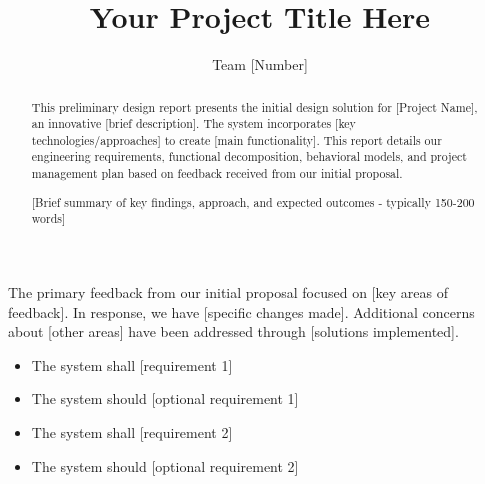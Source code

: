 \documentclass[final]{../designreport}
\title{Your Project Title Here}
\author{Team [Number]}
\begin{document}
\maketitle

\makefrontmatter

\begin{abstract}
This preliminary design report presents the initial design solution for [Project Name], an innovative [brief description]. The system incorporates [key technologies/approaches] to create [main functionality]. This report details our engineering requirements, functional decomposition, behavioral models, and project management plan based on feedback received from our initial proposal.

[Brief summary of key findings, approach, and expected outcomes - typically 150-200 words]
\end{abstract}

\commentresponse
The primary feedback from our initial proposal focused on [key areas of feedback]. In response, we have [specific changes made]. Additional concerns about [other areas] have been addressed through [solutions implemented].




\requirementsspec

\marketingreqs
\begin{itemize}
    \item The system shall [requirement 1]
    \item The system should [optional requirement 1]
    \item The system shall [requirement 2]
    \item The system should [optional requirement 2]
\end{itemize}

\end{document}
